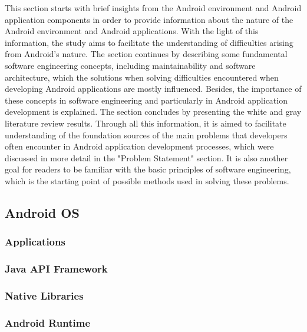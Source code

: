 This section starts with brief insights from the Android environment and Android application components in order to provide information about the nature of the Android environment and Android applications. With the light of this information, the study aims to facilitate the understanding of difficulties arising from Android's nature. The section continues by describing some fundamental software engineering concepts, including maintainability and software architecture, which the solutions when solving difficulties encountered when developing Android applications are mostly influenced. Besides, the importance of these concepts in software engineering and particularly in Android application development is explained. The section concludes by presenting the white and gray literature review results. Through all this information, it is aimed to facilitate understanding of the foundation sources of the main problems that developers often encounter in Android application development processes, which were discussed in more detail in the "Problem Statement" section. It is also another goal for readers to be familiar with the basic principles of software engineering, which is the starting point of possible methods used in solving these problems.
\subsection{Android OS}


\subsubsection{Applications}


\subsubsection{Java API Framework}


\subsubsection{Native Libraries}


\subsubsection{Android Runtime}


